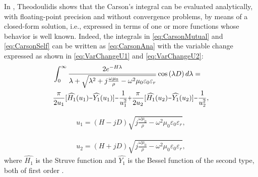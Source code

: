 \documentclass[conference]{IEEEtran}
\begin{document}
In \cite{Theodoulidis2015}, Theodoulidis shows that the Carson's integral can be evaluated analytically, with floating-point precision and without convergence problems, by means of a closed-form solution, i.e.,  expressed in terms of one or more functions whose behavior is well known. Indeed, the integrals in \eqref{eq:CarsonMutual} and \eqref{eq:CarsonSelf} can be written as \eqref{eq:CarsonAna} with the variable change expressed as shown in \eqref{eq:VarChangeU1} and \eqref{eq:VarChangeU2}:
\begin{equation}\label{eq:CarsonAna}
	\begin{aligned}
		&\int_{0}^{\infty}\frac{2e^{-H\lambda}}{\lambda+\sqrt{\lambda^2+j\frac{\omega\mu_{0}}{\rho}-\omega^2\mu_{0}\varepsilon_{0}\varepsilon_{r}}}\cos\left( \lambda D \right) d\lambda= \\
		&\frac{\pi}{2u_1}[\widehat{H_1}(u_1)\scalebox{0.75}[1.0]{\( - \)}\widehat{Y_1}(u_1)]\scalebox{0.75}[1.0]{\( - \)}\frac{1}{u_1^2}\scalebox{0.75}[1.0]{\( + \)}\frac{\pi}{2u_2}[\widehat{H_1}(u_2)\scalebox{0.75}[1.0]{\( - \)}\widehat{Y_1}(u_2)]\scalebox{0.75}[1.0]{\( - \)}\frac{1}{u_2^2},
	\end{aligned}
\end{equation}

\begin{equation}\label{eq:VarChangeU1}
	\begin{aligned}
		u_1=(H-jD)\sqrt{j\frac{\omega\mu_0}{\rho}-\omega^2\mu_0\varepsilon_0\varepsilon_r},
	\end{aligned}
\end{equation}

\begin{equation}\label{eq:VarChangeU2}
	\begin{aligned}
		u_2=(H+jD)\sqrt{j\frac{\omega\mu_0}{\rho}-\omega^2\mu_0\varepsilon_0\varepsilon_r},
	\end{aligned}
\end{equation}
where $\widehat{H_1}$ is the Struve function and $\widehat{Y_1}$ is the Bessel function of the second type, both of first order \cite{Theodoulidis2015}.
\end{document}
